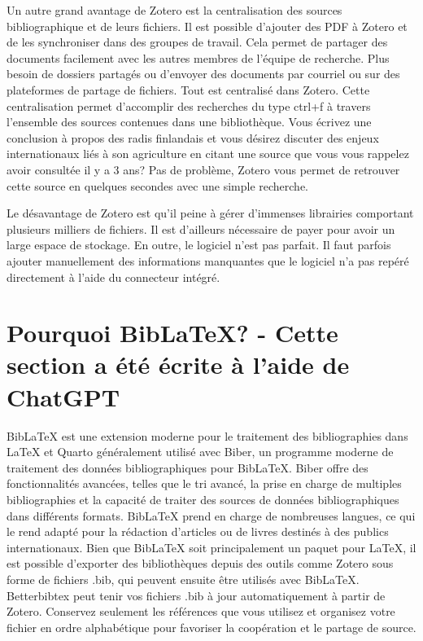 \documentclass[
  letterpaper,
]{scrbook}
\begin{document}
Un autre grand avantage de Zotero est la centralisation des sources
bibliographique et de leurs fichiers. Il est possible d'ajouter des PDF
à Zotero et de les synchroniser dans des groupes de travail. Cela permet
de partager des documents facilement avec les autres membres de l'équipe
de recherche. Plus besoin de dossiers partagés ou d'envoyer des
documents par courriel ou sur des plateformes de partage de fichiers.
Tout est centralisé dans Zotero. Cette centralisation permet d'accomplir
des recherches du type ctrl+f à travers l'ensemble des sources contenues
dans une bibliothèque. Vous écrivez une conclusion à propos des radis
finlandais et vous désirez discuter des enjeux internationaux liés à son
agriculture en citant une source que vous vous rappelez avoir consultée
il y a 3 ans? Pas de problème, Zotero vous permet de retrouver cette
source en quelques secondes avec une simple recherche.

Le désavantage de Zotero est qu'il peine à gérer d'immenses librairies
comportant plusieurs milliers de fichiers. Il est d'ailleurs nécessaire
de payer pour avoir un large espace de stockage. En outre, le logiciel
n'est pas parfait. Il faut parfois ajouter manuellement des informations
manquantes que le logiciel n'a pas repéré directement à l'aide du
connecteur intégré.

\hypertarget{pourquoi-biblatex---cette-section-a-uxe9tuxe9-uxe9crite-uxe0-laide-de-chatgpt}{%
\section{Pourquoi BibLaTeX? - Cette section a été écrite à l'aide de
ChatGPT}\label{pourquoi-biblatex---cette-section-a-uxe9tuxe9-uxe9crite-uxe0-laide-de-chatgpt}}

BibLaTeX est une extension moderne pour le traitement des bibliographies
dans LaTeX et Quarto généralement utilisé avec Biber, un programme
moderne de traitement des données bibliographiques pour BibLaTeX. Biber
offre des fonctionnalités avancées, telles que le tri avancé, la prise
en charge de multiples bibliographies et la capacité de traiter des
sources de données bibliographiques dans différents formats. BibLaTeX
prend en charge de nombreuses langues, ce qui le rend adapté pour la
rédaction d'articles ou de livres destinés à des publics internationaux.
Bien que BibLaTeX soit principalement un paquet pour LaTeX, il est
possible d'exporter des bibliothèques depuis des outils comme Zotero
sous forme de fichiers .bib, qui peuvent ensuite être utilisés avec
BibLaTeX. Betterbibtex peut tenir vos fichiers .bib à jour
automatiquement à partir de Zotero. Conservez seulement les références
que vous utilisez et organisez votre fichier en ordre alphabétique pour
favoriser la coopération et le partage de source.
\end{document}
